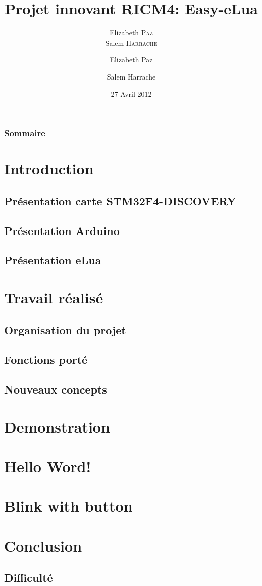 \documentclass{beamer}
\title{Projet innovant RICM4: Easy-eLua}
\author{Elizabeth \textsc{Paz} \\ Salem \textsc{Harrache}}
\institute{Polytech'Grenoble \\
Olivier \textsc{Richard} \\
Didier \textsc{Donsez} \\
}
\author[Elizabeth Paz, Salem Harrache]
{Elizabeth Paz \and Salem Harrache}
\date{27 Avril 2012}
\begin{document}
\begin{frame}
 \maketitle
\end{frame}

\begin{frame}
\frametitle{Sommaire}
\tableofcontents
\end{frame}

\section{Introduction}
\subsection{Présentation carte STM32F4-DISCOVERY}
\subsection{Présentation Arduino}
\subsection{Présentation eLua}
\section{Travail réalisé}
\subsection{Organisation du projet}
\subsection{Fonctions porté}
\subsection{Nouveaux concepts}
\section{Demonstration}
\section{Hello Word!}
\section{Blink with button}
\section{Conclusion}
\subsection{Difficulté}
\end{document}
